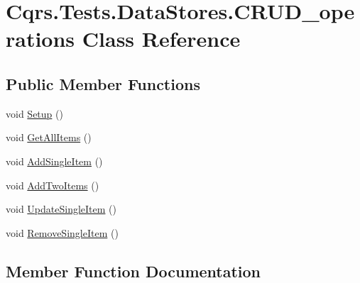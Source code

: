 \hypertarget{classCqrs_1_1Tests_1_1DataStores_1_1CRUD__operations}{}\section{Cqrs.\+Tests.\+Data\+Stores.\+C\+R\+U\+D\+\_\+operations Class Reference}
\label{classCqrs_1_1Tests_1_1DataStores_1_1CRUD__operations}
\subsection*{Public Member Functions}
\begin{DoxyCompactItemize}
\item 
void \hyperlink{classCqrs_1_1Tests_1_1DataStores_1_1CRUD__operations_a7d902349c40e057dab4f379ae17ec1b3_a7d902349c40e057dab4f379ae17ec1b3}{Setup} ()
\item 
void \hyperlink{classCqrs_1_1Tests_1_1DataStores_1_1CRUD__operations_a1ab13a7d6951b9da63f0a5e8f34e3f0c_a1ab13a7d6951b9da63f0a5e8f34e3f0c}{Get\+All\+Items} ()
\item 
void \hyperlink{classCqrs_1_1Tests_1_1DataStores_1_1CRUD__operations_ab5e28e6ca3a7e1fc976268d407ed5b41_ab5e28e6ca3a7e1fc976268d407ed5b41}{Add\+Single\+Item} ()
\item 
void \hyperlink{classCqrs_1_1Tests_1_1DataStores_1_1CRUD__operations_ac1d3e0a8dbe882f1adfaa4b60ccc8688_ac1d3e0a8dbe882f1adfaa4b60ccc8688}{Add\+Two\+Items} ()
\item 
void \hyperlink{classCqrs_1_1Tests_1_1DataStores_1_1CRUD__operations_abd14b0c7589f2c4ba3aea00576881f78_abd14b0c7589f2c4ba3aea00576881f78}{Update\+Single\+Item} ()
\item 
void \hyperlink{classCqrs_1_1Tests_1_1DataStores_1_1CRUD__operations_aa52853051c3b13619c6e59ec5c21b391_aa52853051c3b13619c6e59ec5c21b391}{Remove\+Single\+Item} ()
\end{DoxyCompactItemize}


\subsection{Member Function Documentation}
\mbox{\label{classCqrs_1_1Tests_1_1DataStores_1_1CRUD__operations_ab5e28e6ca3a7e1fc976268d407ed5b41_ab5e28e6ca3a7e1fc976268d407ed5b41}} 
